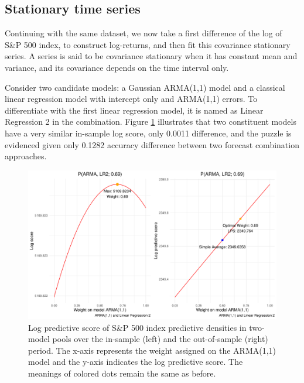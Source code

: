 \documentclass{monashthesis}
\begin{document}
\hypertarget{stationary-time-series}{%
\subsection{Stationary time series}\label{stationary-time-series}}

Continuing with the same dataset, we now take a first difference of the log of S\&P 500 index, to construct log-returns, and then fit this covariance stationary series. A series is said to be covariance stationary when it has constant mean and variance, and its covariance depends on the time interval only.

Consider two candidate models: a Gaussian ARMA(1,1) model and a classical linear regression model with intercept only and ARMA(1,1) errors. To differentiate with the first linear regression model, it is named as Linear Regression 2 in the combination. Figure \ref{fig:stat} illustrates that two constituent models have a very similar in-sample log score, only 0.0011 difference, and the puzzle is evidenced given only 0.1282 accuracy difference between two forecast combination approaches.

\begin{figure}[ht]
\centering
\includegraphics[scale=0.6]{figures/SP500_stationary.pdf}
\caption{Log predictive score of S\&P 500 index predictive densities in two-model pools over the in-sample (left) and the out-of-sample (right) period. The x-axis represents the weight assigned on the ARMA(1,1) model and the y-axis indicates the log predictive score. The meanings of colored dots remain the same as before.}
\label{fig:stat}
\end{figure}
\end{document}
